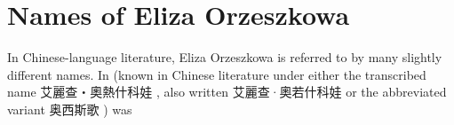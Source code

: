 \section{Names of Eliza Orzeszkowa}
In Chinese-language literature, Eliza Orzeszkowa is referred to by many slightly different names.
In 
(known in Chinese literature under either the transcribed name 艾麗查・奧熱什科娃 , also written 艾麗查·奧若什科娃  or the abbreviated variant 奥西斯歌 ) was 